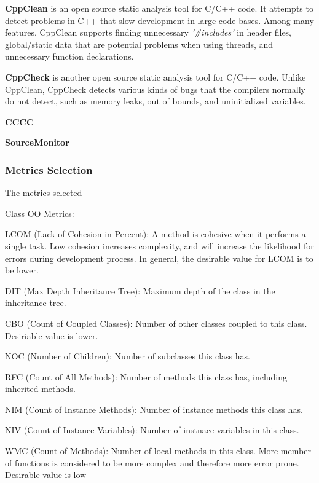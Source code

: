 \textbf{CppClean} is an open source static analysis tool for C/C++ code. It attempts to detect problems in C++ that slow development in large code bases. Among many features, CppClean supports finding unnecessary \textit{'\#includes'} in header files, global/static data that are potential problems when using threads, and unnecessary function declarations.

\textbf{CppCheck} is another open source static analysis tool for C/C++ code. Unlike CppClean, CppCheck detects various kinds of bugs that the compilers normally do not detect, such as memory leaks, out of bounds, and uninitialized variables.

\textbf{CCCC}

\textbf{SourceMonitor}

\subsubsection{Metrics Selection}
The metrics selected 


Class OO Metrics:

LCOM (Lack of Cohesion in Percent): A method is cohesive when it performs a single task. Low cohesion increases complexity, and will increase the likelihood for errors during development process. In general, the desirable value for LCOM is to be lower. 

DIT (Max Depth Inheritance Tree): Maximum depth of the class in the inheritance tree. 

CBO (Count of Coupled Classes): Number of other classes coupled to this class. Desiriable value is lower. 

NOC (Number of Children): Number of subclasses this class has.

RFC (Count of All Methods): Number of methods this class has, including inherited methods.

NIM (Count of Instance Methods): Number of instance methods this class has.

NIV (Count of Instance Variables): Number of instnace variables in this class.

WMC (Count of Methods): Number of local methods in this class. More member of functions is considered to be more complex and therefore more error prone. Desirable value is low







